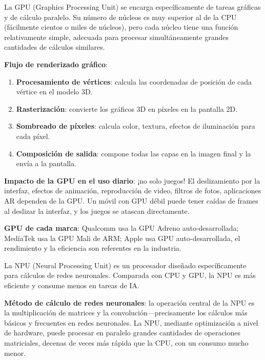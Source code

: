 
La GPU (Graphics Processing Unit) se encarga específicamente de tareas gráficas y de cálculo paralelo. Su número de núcleos es muy superior al de la CPU (fácilmente cientos o miles de núcleos), pero cada núcleo tiene una función relativamente simple, adecuada para procesar simultáneamente grandes cantidades de cálculos similares.

\textbf{Flujo de renderizado gráfico}:

\begin{enumerate}
  \item \textbf{Procesamiento de vértices}: calcula las coordenadas de posición de cada vértice en el modelo 3D.
  \item \textbf{Rasterización}: convierte los gráficos 3D en píxeles en la pantalla 2D.
  \item \textbf{Sombreado de píxeles}: calcula color, textura, efectos de iluminación para cada píxel.
  \item \textbf{Composición de salida}: compone todas las capas en la imagen final y la envía a la pantalla.
\end{enumerate}

\textbf{Impacto de la GPU en el uso diario}: ¡no solo juegos! El deslizamiento por la interfaz, efectos de animación, reproducción de video, filtros de fotos, aplicaciones AR dependen de la GPU. Un móvil con GPU débil puede tener caídas de frames al deslizar la interfaz, y los juegos se atascan directamente.

\textbf{GPU de cada marca}: Qualcomm usa la GPU Adreno auto-desarrollada; MedíaTek usa la GPU Mali de ARM; Apple usa GPU auto-desarrollada, el rendimiento y la eficiencia son referentes en la industria.


La NPU (Neural Processing Unit) es un procesador diseñado específicamente para cálculos de redes neuronales. Comparada con CPU y GPU, la NPU es más eficiente y consume menos en tareas de IA.

\textbf{Método de cálculo de redes neuronales}: la operación central de la NPU es la multiplicación de matrices y la convolución—precisamente los cálculos más básicos y frecuentes en redes neuronales. La NPU, mediante optimización a nivel de hardware, puede procesar en paralelo grandes cantidades de operaciones matriciales, decenas de veces más rápida que la CPU, con un consumo mucho menor.

